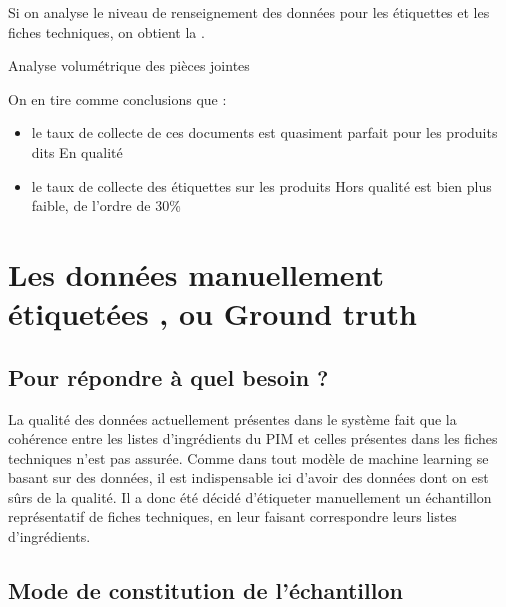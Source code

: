             Si on analyse le niveau de renseignement des données pour les étiquettes et les fiches techniques, on obtient la .

            \begin{table}[htbp]
                \begin{center}
                {\tiny
                
                }
                \caption{Analyse volumétrique des pièces jointes}
                \label{tbl:attached_files_counts}
                \end{center}
            \end{table}

            On en tire comme conclusions que : 
            \begin{itemize}
                \item le taux de collecte de ces documents est quasiment parfait pour les produits dits \og En qualité \fg
                \item le taux de collecte des étiquettes sur les produits \og Hors qualité \fg est bien plus faible, de l'ordre de 30\%
            \end{itemize}

        \section{Les données \og manuellement étiquetées \fg, ou \og Ground truth \fg}
        \label{manually_labelled_data}

            \subsection{Pour répondre à quel besoin ?}

            La qualité des données actuellement présentes dans le système fait que la cohérence entre les listes d'ingrédients du PIM et celles présentes dans les fiches techniques n'est pas assurée.
            Comme dans tout modèle de machine learning se basant sur des données, il est indispensable ici d'avoir des données dont on est sûrs de la qualité.
            Il a donc été décidé d'étiqueter manuellement un échantillon représentatif de fiches techniques, en leur faisant correspondre leurs listes d'ingrédients.

            \subsection{Mode de constitution de l'échantillon}
            
